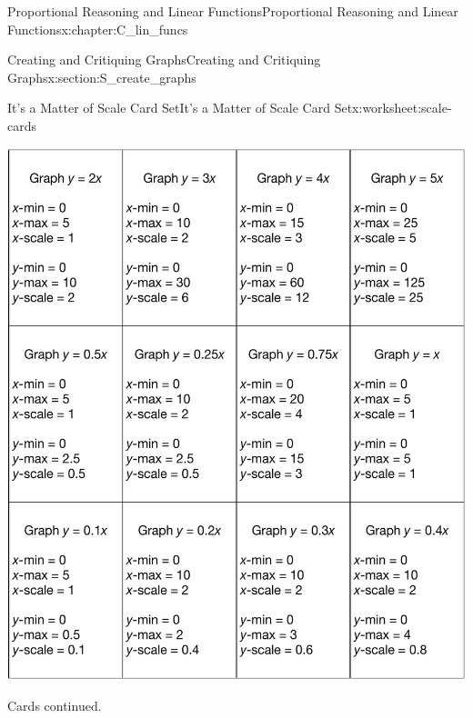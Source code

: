 \documentclass[oneside,10pt,]{book}
\numberwithin{equation}{chapter}
\begin{document}
\begin{chapterptx}{Proportional Reasoning and Linear Functions}{}{Proportional Reasoning and Linear Functions}{}{}{x:chapter:C_lin_funcs}
\begin{sectionptx}{Creating and Critiquing Graphs}{}{Creating and Critiquing Graphs}{}{}{x:section:S_create_graphs}
\begin{worksheet-subsection}{It's a Matter of Scale Card Set}{}{It's a Matter of Scale Card Set}{}{}{x:worksheet:scale-cards}
\begin{image}{0}{1}{0}
\includegraphics[width=\linewidth]{external/scale-cards-1.pdf}
\end{image}%
\clearpage
Cards continued.%
\begin{image}{0}{1}{0}%

\end{image}
\end{worksheet-subsection}
\end{sectionptx}
\end{chapterptx}
\end{document}
